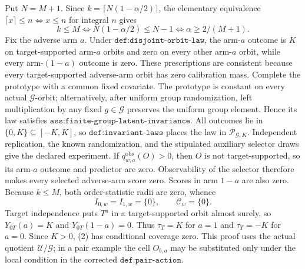 Put \(N=M+1\). Since \(k=\lceil N(1-\alpha/2)\rceil\), the elementary equivalence \(\lceil x\rceil\le n\Longleftrightarrow x\le n\) for integral \(n\) gives \[k\le M\Longleftrightarrow N(1-\alpha/2)\le N-1\Longleftrightarrow \alpha\ge 2/(M+1).\tag{1}\] Fix the adverse arm \(a\). Under \(\texttt{def:disjoint-orbit-law}\), the arm-\(a\) outcome is \(K\) on target-supported arm-\(a\) orbits and zero on every other arm-\(a\) orbit, while every arm-\((1-a)\) outcome is zero. These prescriptions are consistent because every target-supported adverse-arm orbit has zero calibration mass. Complete the prototype with a common fixed covariate. The prototype is constant on every actual \(\mathcal G\)-orbit; alternatively, after uniform group randomization, left multiplication by any fixed \(g\in\mathcal G\) preserves the uniform group element. Hence its law satisfies \(\texttt{ass:finite-group-latent-invariance}\). All outcomes lie in \(\{0,K\}\subseteq[-K,K]\), so \(\texttt{def:invariant-laws}\) places the law in \(\mathcal P_{\mathcal G,K}\). Independent replication, the known randomization, and the stipulated auxiliary selector draws give the declared experiment. If \(q^{\mathrm{obs}}_{w,a}(O)>0\), then \(O\) is not target-supported, so its arm-\(a\) outcome and predictor are zero. Observability of the selector therefore makes every selected adverse-arm score zero. Scores in arm \(1-a\) are also zero. Because \(k\le M\), both order-statistic radii are zero, whence \[I_{0,w}=I_{1,w}=\{0\},\qquad \mathcal C_w=\{0\}.\tag{2}\] Target independence puts \(T^a\) in a target-supported orbit almost surely, so \(Y_{0T}(a)=K\) and \(Y_{0T}(1-a)=0\). Thus \(\tau_T=K\) for \(a=1\) and \(\tau_T=-K\) for \(a=0\). Since \(K>0\), (2) has conditional coverage zero. This proof uses the actual quotient \(\mathcal U/\mathcal G\); in a pair example the cell \(O_{b,a}\) may be substituted only under the local condition in the corrected \(\texttt{def:pair-action}\).